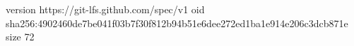 version https://git-lfs.github.com/spec/v1
oid sha256:4902460de7be041f03b7f30f812b94b51e6dee272ed1ba1e914e206c3dcb871e
size 72
